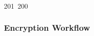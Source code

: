201~200~\documentclass{article}
\begin{document}
	                                                                                                                                                                                                                                                                                                	                                                                                                                                        	    	                                                                                                	                                                                                                                                                                                                                                                                                                                                	                                                                        	                                                                        	                                                                                                                                        	                                                                                                                                                                                                                        	                                                                                                                            	                                                                	                                                                                                    \subsubsection{Encryption Workflow}
\end{document}
